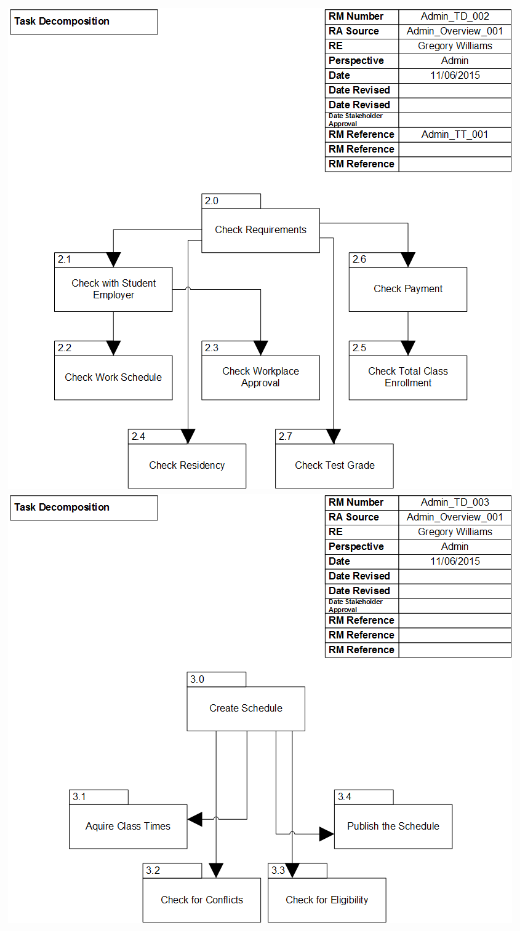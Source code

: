 \documentclass{article}
\begin{document}
	\includegraphics[width=\textwidth]{TaskDecomposition2}
	\\
	\includegraphics[width=\textwidth]{TaskDecomposition3}
	\\
\end{document}
